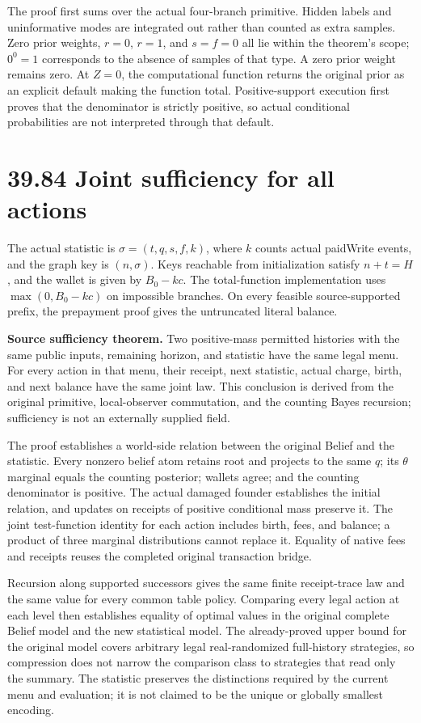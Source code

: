 \documentclass[
  english,
  11pt,
  oneside]{book}
\begin{document}
The proof first sums over the actual four-branch primitive. Hidden labels and uninformative modes are integrated out rather than counted as extra samples. Zero prior weights, \(r=0\), \(r=1\), and \(s=f=0\) all lie within the theorem's scope; \(0^0=1\) corresponds to the absence of samples of that type. A zero prior weight remains zero. At \(Z=0\), the computational function returns the original prior as an explicit default making the function total. Positive-support execution first proves that the denominator is strictly positive, so actual conditional probabilities are not interpreted through that default.

\section{39.84 Joint sufficiency for all actions}\label{joint-sufficiency-for-all-actions}

The actual statistic is \(\sigma=(t,q,s,f,k)\), where \(k\) counts actual paidWrite events, and the graph key is \((n,\sigma)\). Keys reachable from initialization satisfy \(n+t=H\), and the wallet is given by \(B_0-kc\). The total-function implementation uses \(\max(0,B_0-kc)\) on impossible branches. On every feasible source-supported prefix, the prepayment proof gives the untruncated literal balance.

\textbf{Source sufficiency theorem.} Two positive-mass permitted histories with the same public inputs, remaining horizon, and statistic have the same legal menu. For every action in that menu, their receipt, next statistic, actual charge, birth, and next balance have the same joint law. This conclusion is derived from the original primitive, local-observer commutation, and the counting Bayes recursion; sufficiency is not an externally supplied field.

The proof establishes a world-side relation between the original Belief and the statistic. Every nonzero belief atom retains root and projects to the same \(q\); its \(\theta\) marginal equals the counting posterior; wallets agree; and the counting denominator is positive. The actual damaged founder establishes the initial relation, and updates on receipts of positive conditional mass preserve it. The joint test-function identity for each action includes birth, fees, and balance; a product of three marginal distributions cannot replace it. Equality of native fees and receipts reuses the completed original transaction bridge.

Recursion along supported successors gives the same finite receipt-trace law and the same value for every common table policy. Comparing every legal action at each level then establishes equality of optimal values in the original complete Belief model and the new statistical model. The already-proved upper bound for the original model covers arbitrary legal real-randomized full-history strategies, so compression does not narrow the comparison class to strategies that read only the summary. The statistic preserves the distinctions required by the current menu and evaluation; it is not claimed to be the unique or globally smallest encoding.
\end{document}
